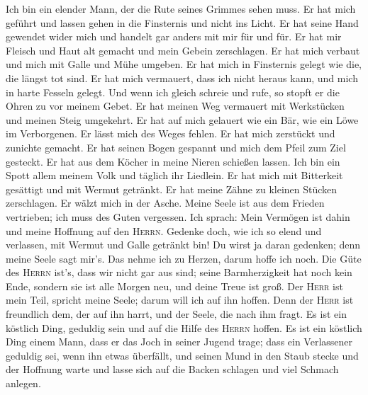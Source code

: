  Ich bin ein elender Mann, der die Rute seines Grimmes
sehen muss.  Er hat mich geführt und lassen gehen in die
Finsternis und nicht ins Licht.  Er hat seine Hand
gewendet wider mich und handelt gar anders mit mir für und für.
 Er hat mir Fleisch und Haut alt gemacht und mein Gebein
zerschlagen.  Er hat mich verbaut und mich mit Galle und
Mühe umgeben.  Er hat mich in Finsternis gelegt wie die,
die längst tot sind.  Er hat mich vermauert, dass ich
nicht heraus kann, und mich in harte Fesseln gelegt.  Und
wenn ich gleich schreie und rufe, so stopft er die Ohren zu vor meinem
Gebet.  Er hat meinen Weg vermauert mit Werkstücken und
meinen Steig umgekehrt.  Er hat auf mich gelauert wie ein
Bär, wie ein Löwe im Verborgenen.  Er lässt mich des
Weges fehlen. Er hat mich zerstückt und zunichte gemacht.
 Er hat seinen Bogen gespannt und mich dem Pfeil zum Ziel
gesteckt.  Er hat aus dem Köcher in meine Nieren schießen
lassen.  Ich bin ein Spott allem meinem Volk und täglich
ihr Liedlein.  Er hat mich mit Bitterkeit gesättigt und
mit Wermut getränkt.  Er hat meine Zähne zu kleinen
Stücken zerschlagen. Er wälzt mich in der Asche.  Meine
Seele ist aus dem Frieden vertrieben; ich muss des Guten vergessen.
 Ich sprach: Mein Vermögen ist dahin und meine Hoffnung
auf den \textsc{Herrn}.  Gedenke doch, wie ich so elend
und verlassen, mit Wermut und Galle getränkt bin!  Du
wirst ja daran gedenken; denn meine Seele sagt mir's. 
Das nehme ich zu Herzen, darum hoffe ich noch.  Die Güte
des \textsc{Herrn} ist's, dass wir nicht gar aus sind; seine
Barmherzigkeit hat noch kein Ende,  sondern sie ist alle
Morgen neu, und deine Treue ist groß.  Der \textsc{Herr}
ist mein Teil, spricht meine Seele; darum will ich auf ihn hoffen.
 Denn der \textsc{Herr} ist freundlich dem, der auf ihn
harrt, und der Seele, die nach ihm fragt.  Es ist ein
köstlich Ding, geduldig sein und auf die Hilfe des \textsc{Herrn}
hoffen.  Es ist ein köstlich Ding einem Mann, dass er das
Joch in seiner Jugend trage;  dass ein Verlassener
geduldig sei, wenn ihn etwas überfällt,  und seinen Mund
in den Staub stecke und der Hoffnung warte  und lasse
sich auf die Backen schlagen und viel Schmach anlegen. 
